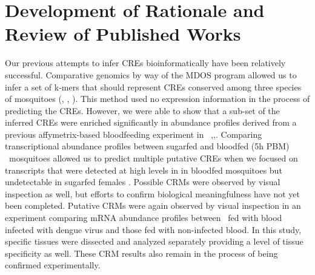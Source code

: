 \chapter{Development of Rationale and Review of Published Works}

Our previous attempts to infer \glspl{CRE} bioinformatically have been relatively successful.
Comparative genomics by way of the \gls{MDOS} program allowed us to infer a set of k-mers that should represent \glspl{CRE} conserved among three species of mosquitoes (\Aa, \Ag, \Cq).
This method used no expression information in the process of predicting the \glspl{CRE}.
However, we were able to show that a sub-set of the inferred \glspl{CRE} were enriched significantly in abundance profiles derived from a previous affymetrix-based bloodfeeding experiment in \Ag\ \cite{Marinotti2005},\cite{Marinotti2006},\cite{Sieglaff2009}.
Comparing transcriptional abundance profiles between sugarfed and bloodfed (5h \gls{PBM}) \Aa\ mosquitoes allowed us to predict multiple putative \glspl{CRE} when we focused on transcripts that were detected at high levels in in bloodfed mosquitoes but undetectable in sugarfed females \cite{Bonizzoni2011}.
Possible \glspl{CRM} were observed by visual inspection as well, but efforts to confirm biological meaningfulness have not yet been completed.
Putative \glspl{CRM} were again observed by visual inspection in an experiment comparing mRNA abundance profiles between \Aa\ fed with blood infected with dengue virus and those fed with non-infected blood.
In this study, specific tissues were dissected and analyzed separately providing a level of tissue specificity as well.
These \gls{CRM} results also remain in the process of being confirmed experimentally.

